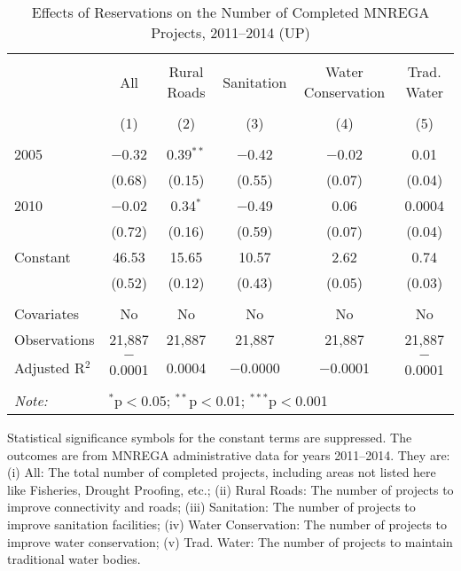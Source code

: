 \begin{table}[!htbp]
\centering
\begin{threeparttable}

  \caption{Effects of Reservations on the Number of Completed MNREGA Projects, 2011--2014 (UP)} 
  \label{main_mnrega_up_2005_2010} 
\scriptsize 
\begin{tabular}{@{\extracolsep{0pt}}lccccc} 
\\[-1.8ex]\hline 
\hline \\[-1.8ex] 
 & All & Rural Roads & Sanitation & Water Conservation & Trad. Water \\ 
\\[-1.8ex] & (1) & (2) & (3) & (4) & (5)\\ 
\hline \\[-1.8ex] 
 2005 & $-$0.32 & 0.39$^{**}$ & $-$0.42 & $-$0.02 & 0.01 \\ 
  & (0.68) & (0.15) & (0.55) & (0.07) & (0.04) \\ 
  2010 & $-$0.02 & 0.34$^{*}$ & $-$0.49 & 0.06 & 0.0004 \\ 
  & (0.72) & (0.16) & (0.59) & (0.07) & (0.04) \\ 
  Constant & 46.53 & 15.65 & 10.57 & 2.62 & 0.74 \\ 
  & (0.52) & (0.12) & (0.43) & (0.05) & (0.03) \\ 
 \hline \\[-1.8ex] 
Covariates & No & No & No & No & No \\ 
Observations & 21,887 & 21,887 & 21,887 & 21,887 & 21,887 \\ 
Adjusted R$^{2}$ & $-$0.0001 & 0.0004 & $-$0.0000 & $-$0.0001 & $-$0.0001 \\ 
\hline 
\hline \\[-1.8ex] 
\textit{Note:}  & \multicolumn{5}{l}{$^{*}$p$<$0.05; $^{**}$p$<$0.01; $^{***}$p$<$0.001} \\ 
\end{tabular} 
\begin{tablenotes}[flushleft]
\scriptsize
\item Statistical significance symbols for the constant terms are suppressed. The outcomes are from MNREGA administrative data for years 2011--2014. They are: 
(i) All: The total number of completed projects, including areas not listed here like Fisheries, Drought Proofing, etc.;
(ii) Rural Roads: The number of projects to improve connectivity and roads;
(iii) Sanitation: The number of projects to improve sanitation facilities;
(iv) Water Conservation: The number of projects to improve water conservation;
(v) Trad. Water: The number of projects to maintain traditional water bodies.
\end{tablenotes}
\end{threeparttable}
\end{table}
